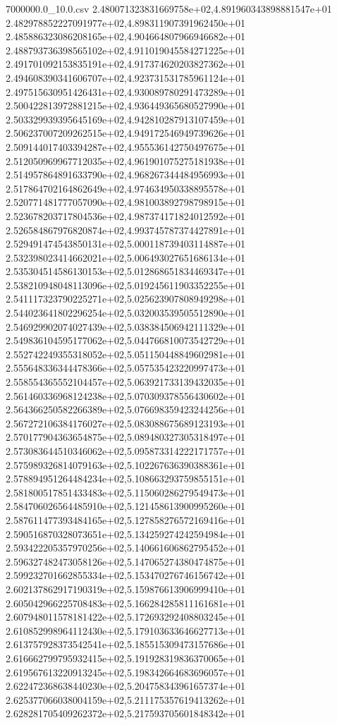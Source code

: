 \begin{filecontents*}{7000000.0_10.0.csv}
2.480071323831669758e+02,4.891960343898881547e+01
2.482978852227091977e+02,4.898311907391962450e+01
2.485886323086208165e+02,4.904664807966946682e+01
2.488793736398565102e+02,4.911019045584271225e+01
2.491701092153835191e+02,4.917374620203827362e+01
2.494608390341606707e+02,4.923731531785961124e+01
2.497515630951426431e+02,4.930089780291473289e+01
2.500422813972881215e+02,4.936449365680527990e+01
2.503329939395645169e+02,4.942810287913107459e+01
2.506237007209262515e+02,4.949172546949739626e+01
2.509144017403394287e+02,4.955536142750497675e+01
2.512050969967712035e+02,4.961901075275181938e+01
2.514957864891633790e+02,4.968267344484956993e+01
2.517864702164862649e+02,4.974634950338895578e+01
2.520771481777057090e+02,4.981003892798798915e+01
2.523678203717804536e+02,4.987374171824012592e+01
2.526584867976820874e+02,4.993745787374427891e+01
2.529491474543850131e+02,5.000118739403114887e+01
2.532398023414662021e+02,5.006493027651686134e+01
2.535304514586130153e+02,5.012868651834469347e+01
2.538210948048113096e+02,5.019245611903352255e+01
2.541117323790225271e+02,5.025623907808949298e+01
2.544023641802296254e+02,5.032003539505512890e+01
2.546929902074027439e+02,5.038384506942111329e+01
2.549836104595177062e+02,5.044766810073542729e+01
2.552742249355318052e+02,5.051150448849602981e+01
2.555648336344478366e+02,5.057535423220997473e+01
2.558554365552104457e+02,5.063921733139432035e+01
2.561460336968124238e+02,5.070309378556430602e+01
2.564366250582266389e+02,5.076698359423244256e+01
2.567272106384176027e+02,5.083088675689123193e+01
2.570177904363654875e+02,5.089480327305318497e+01
2.573083644510346062e+02,5.095873314222171757e+01
2.575989326814079163e+02,5.102267636390388361e+01
2.578894951264484234e+02,5.108663293759855151e+01
2.581800517851433483e+02,5.115060286279549473e+01
2.584706026564485910e+02,5.121458613900995260e+01
2.587611477393484165e+02,5.127858276572169416e+01
2.590516870328073651e+02,5.134259274242594984e+01
2.593422205357970256e+02,5.140661606862795452e+01
2.596327482473058126e+02,5.147065274380474875e+01
2.599232701662855334e+02,5.153470276746156742e+01
2.602137862917190319e+02,5.159876613906999410e+01
2.605042966225708483e+02,5.166284285811161681e+01
2.607948011578181422e+02,5.172693292408803245e+01
2.610852998964112430e+02,5.179103633646627713e+01
2.613757928373542541e+02,5.185515309473157686e+01
2.616662799795932415e+02,5.191928319836370065e+01
2.619567613220913245e+02,5.198342664683696057e+01
2.622472368638440230e+02,5.204758343961657374e+01
2.625377066038004159e+02,5.211175357619413262e+01
2.628281705409262372e+02,5.217593705601848342e+01

\end{filecontents*}
